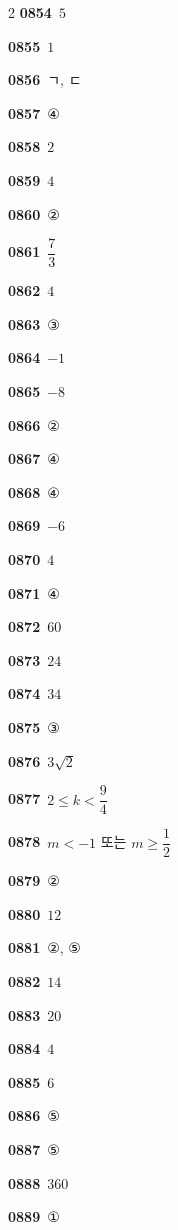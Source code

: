 \documentclass[10pt,a4paper]{article}
\begin{document}
\begin{multicols}{2}
\noindent\textbf{0854}\ $5$\par
\noindent\textbf{0855}\ $1$\par
\noindent\textbf{0856}\ ㄱ, ㄷ\par
\noindent\textbf{0857}\ ④\par
\noindent\textbf{0858}\ $2$\par
\noindent\textbf{0859}\ $4$\par
\noindent\textbf{0860}\ ②\par
\noindent\textbf{0861}\ $\dfrac{7}{3}$\par
\noindent\textbf{0862}\ $4$\par
\noindent\textbf{0863}\ ③\par
\noindent\textbf{0864}\ $-1$\par
\noindent\textbf{0865}\ $-8$\par
\noindent\textbf{0866}\ ②\par
\noindent\textbf{0867}\ ④\par
\noindent\textbf{0868}\ ④\par
\noindent\textbf{0869}\ $-6$\par
\noindent\textbf{0870}\ $4$\par
\noindent\textbf{0871}\ ④\par
\noindent\textbf{0872}\ $60$\par
\noindent\textbf{0873}\ $24$\par
\noindent\textbf{0874}\ $34$\par
\noindent\textbf{0875}\ ③\par
\noindent\textbf{0876}\ $3\sqrt{2}$\par
\noindent\textbf{0877}\ $2\le k<\dfrac{9}{4}$\par
\noindent\textbf{0878}\ $m<-1$ 또는 $m\ge\dfrac{1}{2}$\par
\noindent\textbf{0879}\ ②\par
\noindent\textbf{0880}\ $12$\par
\noindent\textbf{0881}\ ②, ⑤\par
\noindent\textbf{0882}\ $14$\par
\noindent\textbf{0883}\ $20$\par
\noindent\textbf{0884}\ $4$\par
\noindent\textbf{0885}\ $6$\par
\noindent\textbf{0886}\ ⑤\par
\noindent\textbf{0887}\ ⑤\par
\noindent\textbf{0888}\ $360$\par
\noindent\textbf{0889}\ ①\par

\end{multicols}
\end{document}
